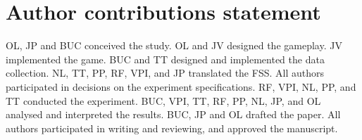 \documentclass[a4paper,doc,floatsintext,natbib,10pt]{apa6}
\begin{document}
\section*{Author contributions statement}
OL, JP and BUC conceived the study.
OL and JV designed the gameplay.
JV implemented the game.
BUC and TT designed and implemented the data collection.
NL, TT, PP, RF, VPI, and JP translated the FSS.
All authors participated in decisions on the experiment specifications.
RF, VPI, NL, PP, and TT conducted the experiment.
BUC, VPI, TT, RF, PP, NL, JP, and OL analysed and interpreted the results.
BUC, JP and OL drafted the paper.
All authors participated in writing and reviewing, and approved the manuscript.




% 
\end{document}
